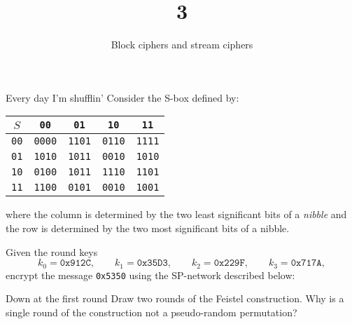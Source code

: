 \documentclass{practice}
\title{3}
\subtitle{Block ciphers and stream ciphers}
\date{\DTMdate{2024-09-25}}
\begin{document}
\maketitle

\begin{task}{Every day I'm shufflin'}
  Consider the S-box defined by:
  \begin{table}[h!]
    \centering
    \begin{tabular}{|c|c|c|c|c|}
      \hline
      $S$ & \texttt{00} & \texttt{01} & \texttt{10} & \texttt{11}\\\hline
      \texttt{00} & \texttt{0000} & \texttt{1101} & \texttt{0110} & \texttt{1111} \\
      \texttt{01} & \texttt{1010} & \texttt{1011} & \texttt{0010} & \texttt{1010} \\
      \texttt{10} & \texttt{0100} & \texttt{1011} & \texttt{1110} & \texttt{1101} \\
      \texttt{11} & \texttt{1100} & \texttt{0101} & \texttt{0010} & \texttt{1001}\\\hline
    \end{tabular}
    \vspace*{-0.7em}
  \end{table}

  where the column is determined by the two least significant bits of a \emph{nibble} and the row is determined by the two most significant bits of a nibble.

  Given the round keys
  \[
    k_0 = \texttt{0x912C},\qquad
    k_1 = \texttt{0x35D3},\qquad
    k_2 = \texttt{0x229F},\qquad
    k_3 = \texttt{0x717A},
  \]
  encrypt the message \texttt{0x5350} using the SP-network described below:
 
  \begin{figure}[h!]
    \centering
    
  \end{figure}
\end{task}

\newpage

\begin{task}{Down at the first round}
  Draw two rounds of the Feistel construction.
  Why is a single round of the construction not a pseudo-random permutation?
\end{task}
\end{document}
